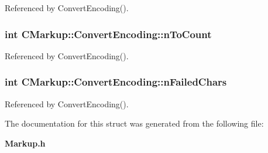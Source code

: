 Referenced by ConvertEncoding().
\subsubsection[nToCount]{\setlength{\rightskip}{0pt plus 5cm}int {\bf CMarkup::ConvertEncoding::nToCount}}\label{structCMarkup_1_1ConvertEncoding_9fe87df87a339214df5e30bce32edcf4}




Referenced by ConvertEncoding().
\subsubsection[nFailedChars]{\setlength{\rightskip}{0pt plus 5cm}int {\bf CMarkup::ConvertEncoding::nFailedChars}}\label{structCMarkup_1_1ConvertEncoding_bfd8cc96d41531109b9301b4d28a695f}




Referenced by ConvertEncoding().

The documentation for this struct was generated from the following file:\begin{CompactItemize}
\item 
{\bf Markup.h}\end{CompactItemize}
